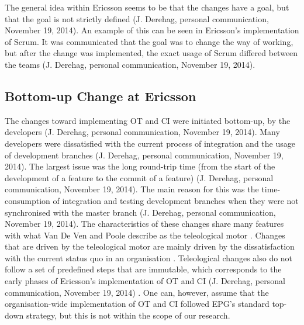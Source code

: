 \documentclass[final_report_innit.tex]{subfiles}
\begin{document}
The general idea within Ericsson seems to be that the changes have a goal, but that the goal is not strictly defined (J. Derehag, personal communication, November 19, 2014). An example of this can be seen in Ericsson’s implementation of Scrum. It was communicated that the goal was to change the way of working, but after the change was implemented, the exact usage of Scrum differed between the teams (J. Derehag, personal communication, November 19, 2014). 

\subsection{Bottom-up Change at Ericsson}
The changes toward implementing OT and CI were initiated bottom-up, by the developers (J. Derehag, personal communication, November 19, 2014). Many developers were dissatisfied with the current process of integration and the usage of development branches (J. Derehag, personal communication, November 19, 2014). The largest issue was the long round-trip time (from the start of the development of a feature to the commit of a feature) (J. Derehag, personal communication, November 19, 2014). The main reason for this was the time-consumption of integration and testing development branches when they were not synchronised with the master branch (J. Derehag, personal communication, November 19, 2014). The characteristics of these changes share many features with what Van De Ven and Poole describe as the teleological motor \cite{van1995explaining}. Changes that are driven by the teleological motor are mainly driven by the dissatisfaction with the current status quo in an organisation \cite{van1995explaining}. Teleological changes also do not follow a set of predefined steps that are immutable, which corresponds to the early phases of Ericsson’s implementation of OT and CI (J. Derehag, personal communication, November 19, 2014) \cite{van1995explaining}. One can, however, assume that the organisation-wide implementation of OT and CI followed EPG’s standard top-down strategy, but this is not within the scope of our research.
\end{document}
